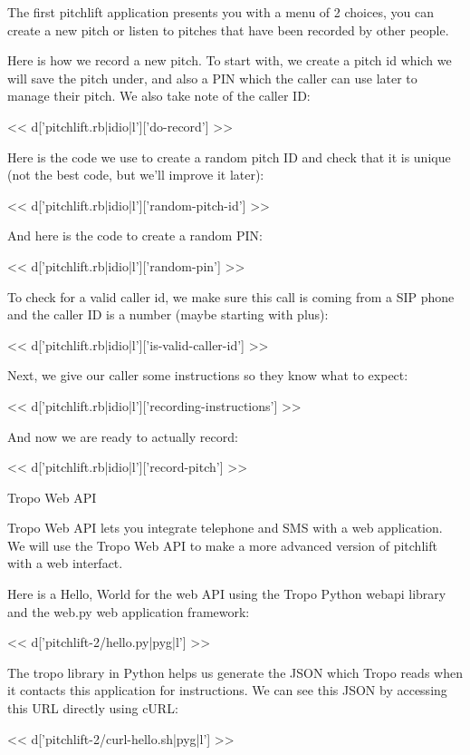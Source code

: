 \documentclass[custom, plainsections]{sciposter}
\begin{document}
\begin{multicols*}{2}
The first pitchlift application presents you with a menu of 2 choices, you can create a new pitch or listen to pitches that have been recorded by other people.

Here is how we record a new pitch. To start with, we create a pitch id which we will save the pitch under, and also a PIN which the caller can use later to manage their pitch. We also take note of the caller ID:

<< d['pitchlift.rb|idio|l']['do-record'] >>

Here is the code we use to create a random pitch ID and check that it is unique (not the best code, but we'll improve it later):

<< d['pitchlift.rb|idio|l']['random-pitch-id'] >>

And here is the code to create a random PIN:

<< d['pitchlift.rb|idio|l']['random-pin'] >>

To check for a valid caller id, we make sure this call is coming from a SIP phone and the caller ID is a number (maybe starting with plus):

<< d['pitchlift.rb|idio|l']['is-valid-caller-id'] >>

Next, we give our caller some instructions so they know what to expect:

<< d['pitchlift.rb|idio|l']['recording-instructions'] >>

And now we are ready to actually record:

<< d['pitchlift.rb|idio|l']['record-pitch'] >>

\pagebreak

\large
Tropo Web API
\small

\vspace{5pt}

 Tropo Web API lets you integrate telephone and SMS with a web application. We will use the Tropo Web API to make a more advanced version of pitchlift with a web interfact.

Here is a Hello, World for the web API using the Tropo Python webapi library and the web.py web application framework:

<< d['pitchlift-2/hello.py|pyg|l'] >>

The tropo library in Python helps us generate the JSON which Tropo reads when it contacts this application for instructions. We can see this JSON by accessing this URL directly using cURL:

<< d['pitchlift-2/curl-hello.sh|pyg|l'] >>


\end{multicols*}
\end{document}
